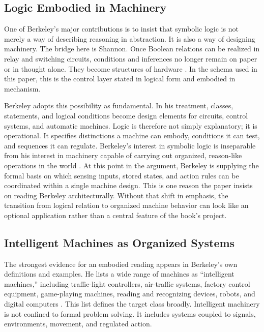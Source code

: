 \documentclass[11pt]{article}
\begin{document}
\subsection*{Logic Embodied in Machinery}

One of Berkeley's major contributions is to insist that symbolic logic is not merely a way of describing reasoning in abstraction. It is also a way of designing machinery. The bridge here is Shannon. Once Boolean relations can be realized in relay and switching circuits, conditions and inferences no longer remain on paper or in thought alone. They become structures of hardware \citep{shannon1938symbolic}. In the schema used in this paper, this is the control layer stated in logical form and embodied in mechanism.

Berkeley adopts this possibility as fundamental. In his treatment, classes, statements, and logical conditions become design elements for circuits, control systems, and automatic machines. Logic is therefore not simply explanatory; it is operational. It specifies distinctions a machine can embody, conditions it can test, and sequences it can regulate. Berkeley's interest in symbolic logic is inseparable from his interest in machinery capable of carrying out organized, reason-like operations in the world \citep{berkeley1959symbolic}. At this point in the argument, Berkeley is supplying the formal basis on which sensing inputs, stored states, and action rules can be coordinated within a single machine design. This is one reason the paper insists on reading Berkeley architecturally. Without that shift in emphasis, the transition from logical relation to organized machine behavior can look like an optional application rather than a central feature of the book's project.

\subsection*{Intelligent Machines as Organized Systems}

The strongest evidence for an embodied reading appears in Berkeley's own definitions and examples. He lists a wide range of machines as ``intelligent machines,'' including traffic-light controllers, air-traffic systems, factory control equipment, game-playing machines, reading and recognizing devices, robots, and digital computers \citep[pp.~66--69]{berkeley1959symbolic}. This list defines the target class broadly. Intelligent machinery is not confined to formal problem solving. It includes systems coupled to signals, environments, movement, and regulated action.
\end{document}
